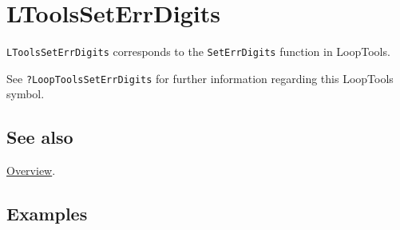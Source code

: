 \documentclass[../FeynHelpersManual.tex]{subfiles}
\begin{document}
\hypertarget{ltoolsseterrdigits}{
\section{LToolsSetErrDigits}\label{ltoolsseterrdigits}}

\texttt{LToolsSetErrDigits} corresponds to the \texttt{SetErrDigits}
function in LoopTools.

See \texttt{?LoopTools\textasciigrave SetErrDigits} for further
information regarding this LoopTools symbol.

\subsection{See also}

\hyperlink{toc}{Overview}.

\subsection{Examples}
\end{document}
